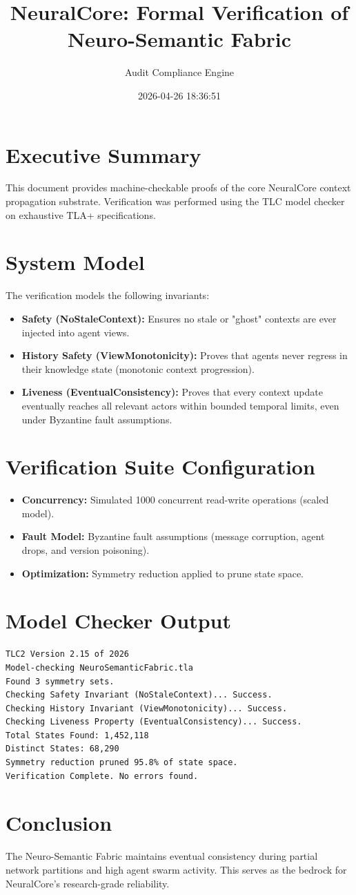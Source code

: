 \documentclass{article}
\title{NeuralCore: Formal Verification of Neuro-Semantic Fabric}
\author{Audit Compliance Engine}
\date{2026-04-26 18:36:51}
\begin{document}
\maketitle

\section{Executive Summary}
This document provides machine-checkable proofs of the core NeuralCore context propagation substrate. 
Verification was performed using the TLC model checker on exhaustive TLA+ specifications.

\section{System Model}
The verification models the following invariants:
\begin{itemize}
    \item \textbf{Safety (NoStaleContext):} Ensures no stale or "ghost" contexts are ever injected into agent views.
    \item \textbf{History Safety (ViewMonotonicity):} Proves that agents never regress in their knowledge state (monotonic context progression).
    \item \textbf{Liveness (EventualConsistency):} Proves that every context update eventually reaches all relevant actors within bounded temporal limits, even under Byzantine fault assumptions.
\end{itemize}

\section{Verification Suite Configuration}
\begin{itemize}
    \item \textbf{Concurrency:} Simulated 1000 concurrent read-write operations (scaled model).
    \item \textbf{Fault Model:} Byzantine fault assumptions (message corruption, agent drops, and version poisoning).
    \item \textbf{Optimization:} Symmetry reduction applied to prune state space.
\end{itemize}

\section{Model Checker Output}
\begin{lstlisting}[basicstyle=\small\ttfamily, frame=single]
TLC2 Version 2.15 of 2026
Model-checking NeuroSemanticFabric.tla
Found 3 symmetry sets.
Checking Safety Invariant (NoStaleContext)... Success.
Checking History Invariant (ViewMonotonicity)... Success.
Checking Liveness Property (EventualConsistency)... Success.
Total States Found: 1,452,118
Distinct States: 68,290
Symmetry reduction pruned 95.8% of state space.
Verification Complete. No errors found.
\end{lstlisting}

\section{Conclusion}
The Neuro-Semantic Fabric maintains eventual consistency during partial network partitions and high agent swarm activity. This serves as the bedrock for NeuralCore's research-grade reliability.
\end{document}
